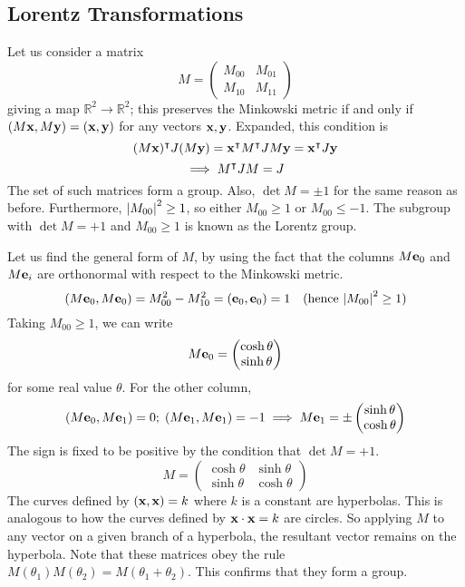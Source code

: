 \documentclass{article}
\begin{document}
\subsection{Lorentz Transformations}
Let us consider a matrix
\[ M = \begin{pmatrix}
		M_{00} & M_{01} \\
		M_{10} & M_{11}
	\end{pmatrix} \]
giving a map $\mathbb R^2 \to \mathbb R^2$; this preserves the Minkowski metric if and only if $(M\vb x, M\vb y) = (\vb x, \vb y)$ for any vectors $\vb x, \vb y$. Expanded, this condition is
\[ (M\vb x)^\intercal J(M \vb y) = \vb x^\intercal M^\intercal J M \vb y = \vb x^\intercal J \vb y \]
\[ \implies M^\intercal J M = J \]
The set of such matrices form a group. Also, $\det M = \pm 1$ for the same reason as before. Furthermore, $\abs{M_{00}}^2 \geq 1$, so either $M_{00} \geq 1$ or $M_{00} \leq -1$. The subgroup with $\det M = +1$ and $M_{00} \geq 1$ is known as the Lorentz group.

Let us find the general form of $M$, by using the fact that the columns $M \vb e_0$ and $M \vb e_i$ are orthonormal with respect to the Minkowski metric.
\[ (M \vb e_0, M \vb e_0) = M_{00}^2 - M_{10}^2 = (\vb e_0, \vb e_0) = 1\quad (\text{hence } \abs{M_{00}}^2 \geq 1) \]
Taking $M_{00} \geq 1$, we can write
\[ M\vb e_0 = \begin{pmatrix}
		\cosh \theta \\ \sinh \theta
	\end{pmatrix} \]
for some real value $\theta$. For the other column,
\[ (M \vb e_0, M \vb e_1) = 0;\; (M \vb e_1, M \vb e_1) = -1 \implies M \vb e_1 = \pm\begin{pmatrix}
		\sinh \theta \\
		\cosh \theta
	\end{pmatrix} \]
The sign is fixed to be positive by the condition that $\det M = +1$.
\[ M = \begin{pmatrix}
		\cosh \theta & \sinh \theta \\
		\sinh \theta & \cosh \theta
	\end{pmatrix} \]
The curves defined by $(\vb x, \vb x) = k$ where $k$ is a constant are hyperbolas. This is analogous to how the curves defined by $\vb x \cdot \vb x = k$ are circles. So applying $M$ to any vector on a given branch of a hyperbola, the resultant vector remains on the hyperbola.
Note that these matrices obey the rule $M(\theta_1) M(\theta_2) = M(\theta_1 + \theta_2)$. This confirms that they form a group.
\end{document}
